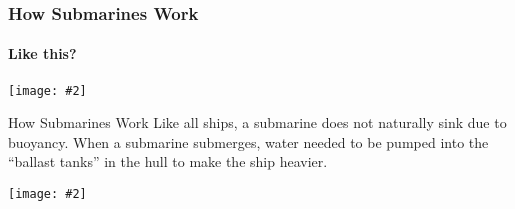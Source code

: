 \documentclass[12pt,aspectratio=169]{beamer}
\newcommand{\pic}[2]{\texttt{[image: \#2]}}
\newcommand{\mb}[1]{\mathbf{#1}}
\begin{document}


\begin{frame}
  \frametitle{How Submarines Work}
  \framesubtitle{Like this?}
  \begin{center}
    \pic{.7}{EbHMOXk.jpg}
  \end{center}
\end{frame}



\begin{frame}{How Submarines Work}
  Like all ships, a submarine does not naturally sink due to buoyancy. When a
  submarine submerges, water needed to be pumped into the  ``ballast tanks'' in
  the hull to make the ship heavier.
  \begin{center}
    \pic{1}{risinglemur.jpg}
  \end{center}
\end{frame}



%  
\end{document}
